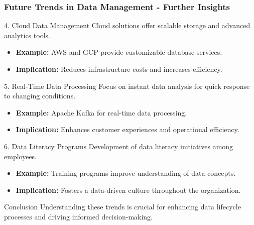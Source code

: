 \documentclass[aspectratio=169]{beamer}
\begin{document}
\begin{frame}[fragile]
    \frametitle{Future Trends in Data Management - Further Insights}
    \begin{block}{4. Cloud Data Management}
        Cloud solutions offer scalable storage and advanced analytics tools.
        \begin{itemize}
            \item \textbf{Example:} AWS and GCP provide customizable database services.
            \item \textbf{Implication:} Reduces infrastructure costs and increases efficiency.
        \end{itemize}
    \end{block}
    
    \begin{block}{5. Real-Time Data Processing}
        Focus on instant data analysis for quick response to changing conditions.
        \begin{itemize}
            \item \textbf{Example:} Apache Kafka for real-time data processing.
            \item \textbf{Implication:} Enhances customer experiences and operational efficiency.
        \end{itemize}
    \end{block}
    
    \begin{block}{6. Data Literacy Programs}
        Development of data literacy initiatives among employees.
        \begin{itemize}
            \item \textbf{Example:} Training programs improve understanding of data concepts.
            \item \textbf{Implication:} Fosters a data-driven culture throughout the organization.
        \end{itemize}
    \end{block}
    
    \begin{block}{Conclusion}
        Understanding these trends is crucial for enhancing data lifecycle processes and driving informed decision-making.
    \end{block}
\end{frame}
\end{document}
